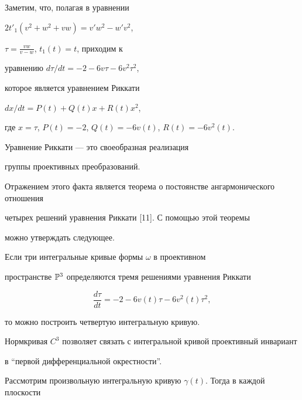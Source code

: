 \begin{notenonum}


Заметим, что, полагая в уравнении 


$2t'_1(v^2+w^2+vw)=v'w^2-w'v^2$,


$\tau=\frac{vw}{v-w}$, $t_1(t)=t$, приходим к 


уравнению $d\tau/dt=-2-6v\tau-6v^2\tau^2$,


которое является уравнением Риккати


$dx/dt=P(t)+Q(t)x+R(t)x^2$,


где $x=\tau$, $P(t)=-2$, $Q(t)=-6v(t)$, $R(t)=-6v^2(t)$.


\end{notenonum}





Уравнение Риккати --- это своеобразная реализация 


группы проективных преобразований. 


Отражением этого факта является теорема о постоянстве ангармонического отношения 


четырех решений уравнения Риккати [11]. С помощью этой теоремы 


можно утверждать следующее.








\begin{thm}


Если три интегральные кривые формы $\omega$ в проективном 


пространстве $\Bbb{P}^3$ определяются тремя решениями уравнения Риккати  


$$


\frac{d\tau}{dt}=-2-6v(t)\tau-6v^2(t)\tau^2,


$$


то можно построить четвертую интегральную кривую.


\end{thm}





Нормкривая $C^3$ позволяет связать с интегральной кривой проективный инвариант 


в ``первой дифференциальной окрестности''.





Рассмотрим произвольную интегральную кривую $\gamma(t)$. Тогда в каждой плоскости 


